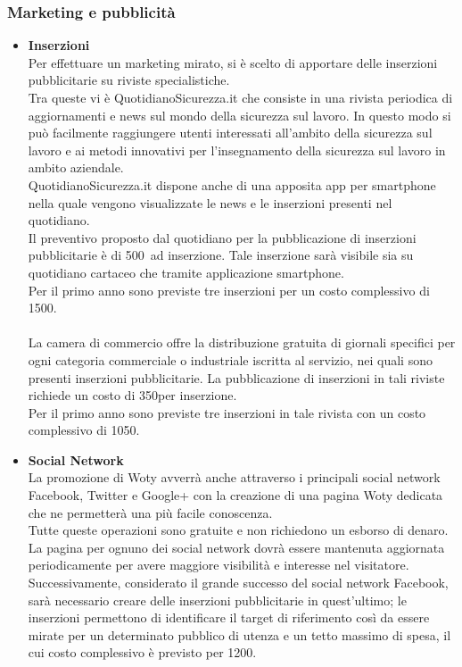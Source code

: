\subsubsection{Marketing e pubblicità}

\begin{itemize}
\item \textbf{Inserzioni}\\
Per effettuare un marketing mirato, si è scelto di apportare delle inserzioni pubblicitarie su riviste specialistiche. \\
Tra queste vi è QuotidianoSicurezza.it che consiste in una rivista periodica di aggiornamenti e news sul mondo della sicurezza sul lavoro. In questo modo si può facilmente raggiungere utenti interessati all'ambito della sicurezza sul lavoro e ai metodi innovativi per l'insegnamento della sicurezza sul lavoro in ambito aziendale.\\
QuotidianoSicurezza.it dispone anche di una apposita app per smartphone nella quale vengono visualizzate le news e le inserzioni presenti nel quotidiano.\\
Il preventivo proposto dal quotidiano per la pubblicazione di inserzioni pubblicitarie è di 500\EUR\ ad inserzione. Tale inserzione sarà visibile sia su quotidiano cartaceo che tramite applicazione smartphone.\\ Per il primo anno sono previste tre inserzioni per un costo complessivo di 1500\EUR.\\
\\
La camera di commercio offre la distribuzione gratuita di giornali specifici per ogni categoria commerciale o industriale iscritta al servizio, nei quali sono presenti inserzioni pubblicitarie. La pubblicazione di inserzioni in tali riviste richiede un costo di 350\EUR per inserzione.\\
Per il primo anno sono previste tre inserzioni in tale rivista con un costo complessivo di 1050\EUR.

\item \textbf{Social Network}\\
La promozione di Woty avverrà anche attraverso i principali social network Facebook, Twitter e Google+ con la creazione di una pagina Woty dedicata che ne permetterà una più facile conoscenza.\\
Tutte queste operazioni sono gratuite e non richiedono un esborso di denaro.\\
La pagina per ognuno dei social network dovrà essere mantenuta aggiornata periodicamente per avere maggiore visibilità e interesse nel visitatore.\\
Successivamente, considerato il grande successo del social network Facebook, sarà necessario creare delle inserzioni pubblicitarie in quest'ultimo; le inserzioni permettono di identificare il target di riferimento così da essere mirate per un determinato pubblico di utenza e un tetto massimo di spesa, il cui costo complessivo è previsto per 1200\EUR.


\end{itemize}
